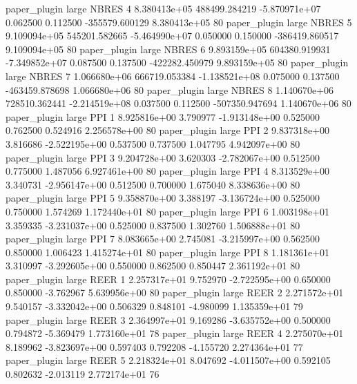        paper_plugin      large    NBRES                 4 8.380413e+05 488499.284219 -5.870971e+07 0.062500 0.112500 -355579.600129 8.380413e+05 80
       paper_plugin      large    NBRES                 5 9.109094e+05 545201.582665 -5.464990e+07 0.050000 0.150000 -386419.860517 9.109094e+05 80
       paper_plugin      large    NBRES                 6 9.893159e+05 604380.919931 -7.349852e+07 0.087500 0.137500 -422282.450979 9.893159e+05 80
       paper_plugin      large    NBRES                 7 1.066680e+06 666719.053384 -1.138521e+08 0.075000 0.137500 -463459.878698 1.066680e+06 80
       paper_plugin      large    NBRES                 8 1.140670e+06 728510.362441 -2.214519e+08 0.037500 0.112500 -507350.947694 1.140670e+06 80
       paper_plugin      large      PPI                 1 8.925816e+00      3.790977 -1.913148e+00 0.525000 0.762500       0.524916 2.256578e+00 80
       paper_plugin      large      PPI                 2 9.837318e+00      3.816686 -2.522195e+00 0.537500 0.737500       1.047795 4.942097e+00 80
       paper_plugin      large      PPI                 3 9.204728e+00      3.620303 -2.782067e+00 0.512500 0.775000       1.487056 6.927461e+00 80
       paper_plugin      large      PPI                 4 8.313529e+00      3.340731 -2.956147e+00 0.512500 0.700000       1.675040 8.338636e+00 80
       paper_plugin      large      PPI                 5 9.358870e+00      3.388197 -3.136724e+00 0.525000 0.750000       1.574269 1.172440e+01 80
       paper_plugin      large      PPI                 6 1.003198e+01      3.359335 -3.231037e+00 0.525000 0.837500       1.302760 1.506888e+01 80
       paper_plugin      large      PPI                 7 8.083665e+00      2.745081 -3.215997e+00 0.562500 0.850000       1.006423 1.415274e+01 80
       paper_plugin      large      PPI                 8 1.181361e+01      3.310997 -3.292605e+00 0.550000 0.862500       0.850447 2.361192e+01 80
       paper_plugin      large     REER                 1 2.257317e+01      9.752970 -2.722595e+00 0.650000 0.850000      -3.762967 5.639956e+00 80
       paper_plugin      large     REER                 2 2.271572e+01      9.540157 -3.332042e+00 0.506329 0.848101      -4.980099 1.135359e+01 79
       paper_plugin      large     REER                 3 2.364997e+01      9.169286 -3.635752e+00 0.500000 0.794872      -5.369479 1.773160e+01 78
       paper_plugin      large     REER                 4 2.275070e+01      8.189962 -3.823697e+00 0.597403 0.792208      -4.155720 2.274364e+01 77
       paper_plugin      large     REER                 5 2.218324e+01      8.047692 -4.011507e+00 0.592105 0.802632      -2.013119 2.772174e+01 76
